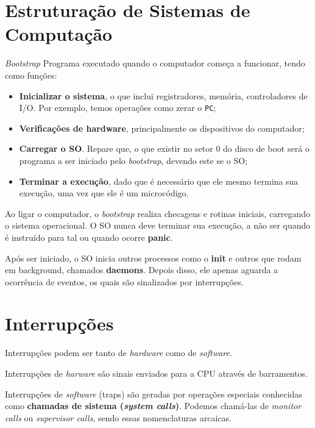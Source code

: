 \section{Estruturação de Sistemas de Computação}
\begin{definicao}{\textit{Bootstrap}}
  Programa executado quando o computador começa a funcionar, tendo como funções:
  \begin{itemize}
    \item \textbf{Inicializar o sistema}, o que inclui registradores, memória, controladores de I/O. Por exemplo, temos operações como zerar o \texttt{PC};
    \item \textbf{Verificações de hardware}, principalmente os dispositivos do computador;
    \item \textbf{Carregar o SO}. Repare que, o que existir no setor 0 do disco de boot será o programa a ser iniciado pelo \textit{bootstrap}, devendo este se o SO;
    \item \textbf{Terminar a execução}, dado que é necessário que ele mesmo termina sua execução, uma vez que ele é um microcódigo.
  \end{itemize}
\end{definicao}

Ao ligar o computador, o \textit{bootstrap} realiza checagens e rotinas iniciais, carregando o sistema operacional. O SO nunca deve terminar sua execução, a não ser quando é instruído para tal ou quando ocorre \textbf{panic}.

Após ser iniciado, o SO inicia outros processos como o \textbf{init} e outros que rodam em background, chamados \textbf{daemons}. Depois disso, ele apenas aguarda a ocorrência de eventos, os quais são sinalizados por interrupções.


















\section{Interrupções}
Interrupções podem ser tanto de \textit{hardware} como de \textit{software}.

Interrupções de \textit{harware} são sinais enviados para a CPU através de barramentos.

Interrupções de \textit{software} (traps) são geradas por operações especiais conhecidas como \textbf{chamadas de sistema (\textit{system calls})}. Podemos chamá-las de \textit{monitor calls} ou \textit{supervisor calls}, sendo essas nomenclaturas arcaicas.

